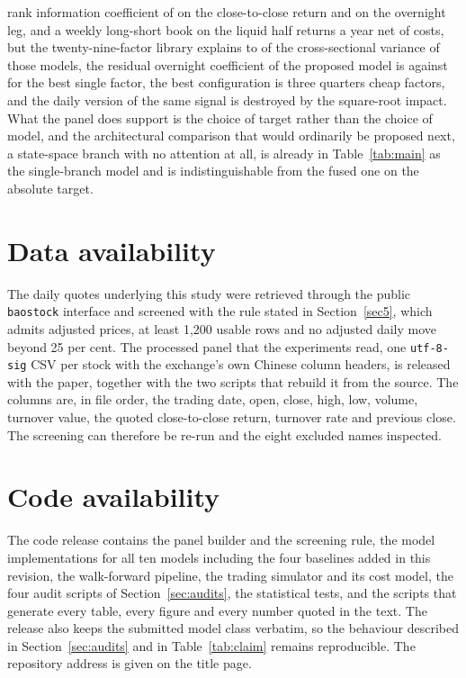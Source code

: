 \documentclass[pdflatex,sn-mathphys-ay]{sn-jnl}
\theoremstyle{thmstyleone}%
\theoremstyle{thmstyletwo}%
\theoremstyle{thmstyletwo}%
\begin{document}
rank information coefficient of \icCcProp{} on the close-to-close return and \icOnProp{} on the
overnight leg, and a weekly long-short book on the liquid half returns \netWk{} a year net of costs,
but the twenty-nine-factor library explains \rSquaredLo{} to \rSquaredHi{} of the cross-sectional
variance of those models, the residual overnight coefficient of the proposed model is \residProp{}
against \bestFactorResid{} for the best single factor, the best configuration is three quarters cheap
factors, and the daily version of the same signal is destroyed by the square-root impact. What the
panel does support is the choice of target rather than the choice of model, and the architectural
comparison that would ordinarily be proposed next, a state-space branch with no attention at all, is
already in Table~\ref{tab:main} as the single-branch model and is indistinguishable from the fused one
on the absolute target.

\backmatter

\section*{Data availability}

The daily quotes underlying this study were retrieved through the public \texttt{baostock} interface
and screened with the rule stated in Section~\ref{sec5}, which admits adjusted prices, at least
1{,}200 usable rows and no adjusted daily move beyond 25 per cent. The processed panel that the
experiments read, one \texttt{utf-8-sig} CSV per stock with the exchange's own Chinese column
headers, is released with the paper, together with the two scripts that rebuild it from the source.
The columns are, in file order, the trading date, open, close, high, low, volume, turnover value,
the quoted close-to-close return, turnover rate and previous close. The screening can therefore be
re-run and
the eight excluded names inspected.

\section*{Code availability}

The code release contains the panel builder and the screening rule, the model implementations for
all ten models including the four baselines added in this revision, the walk-forward
pipeline, the trading simulator and its cost model, the four audit scripts of Section~\ref{sec:audits},
the statistical tests, and the scripts that generate every table, every figure and every number
quoted in the text. The release also keeps the submitted model class verbatim, so the behaviour
described in Section~\ref{sec:audits} and in Table~\ref{tab:claim} remains reproducible. The
repository address is given on the title page.
\end{document}

